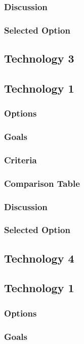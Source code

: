 \documentclass[10pt,draftclsnofoot,onecolumn]{IEEEtran}
\begin{document}
\subsubsection{Discussion}
\subsubsection{Selected Option}
\subsection{Technology 3}
\subsection{Technology 1}
\subsubsection{Options}
\subsubsection{Goals}
\subsubsection{Criteria}
\subsubsection{Comparison Table}
\subsubsection{Discussion}
\subsubsection{Selected Option}
\subsection{Technology 4}
\subsection{Technology 1}
\subsubsection{Options}
\subsubsection{Goals}
\end{document}
